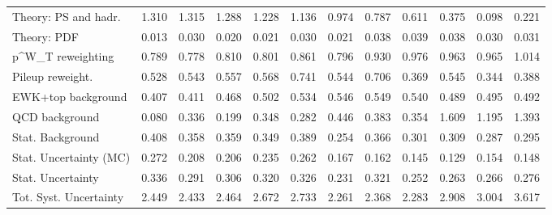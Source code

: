 \begin{tabular}{l|p{0.6cm}p{0.6cm}p{0.6cm}p{0.6cm}p{0.6cm}p{0.6cm}p{0.6cm}p{0.6cm}p{0.6cm}p{0.6cm}p{0.6cm}}
Theory: PS and hadr.                     & 1.310 & 1.315 & 1.288 & 1.228 & 1.136 & 0.974 & 0.787 & 0.611 & 0.375 & 0.098 & 0.221 \\
Theory: PDF                              & 0.013 & 0.030 & 0.020 & 0.021 & 0.030 & 0.021 & 0.038 & 0.039 & 0.038 & 0.030 & 0.031 \\
p^{W}_{T} reweighting                    & 0.789 & 0.778 & 0.810 & 0.801 & 0.861 & 0.796 & 0.930 & 0.976 & 0.963 & 0.965 & 1.014 \\
Pileup reweight.                         & 0.528 & 0.543 & 0.557 & 0.568 & 0.741 & 0.544 & 0.706 & 0.369 & 0.545 & 0.344 & 0.388 \\
EWK+top background                       & 0.407 & 0.411 & 0.468 & 0.502 & 0.534 & 0.546 & 0.549 & 0.540 & 0.489 & 0.495 & 0.492 \\
QCD background                           & 0.080 & 0.336 & 0.199 & 0.348 & 0.282 & 0.446 & 0.383 & 0.354 & 1.609 & 1.195 & 1.393 \\
Stat. Background                         & 0.408 & 0.358 & 0.359 & 0.349 & 0.389 & 0.254 & 0.366 & 0.301 & 0.309 & 0.287 & 0.295 \\
Stat. Uncertainty (MC)                   & 0.272 & 0.208 & 0.206 & 0.235 & 0.262 & 0.167 & 0.162 & 0.145 & 0.129 & 0.154 & 0.148 \\
\hline
Stat. Uncertainty                        & 0.336 & 0.291 & 0.306 & 0.320 & 0.326 & 0.231 & 0.321 & 0.252 & 0.263 & 0.266 & 0.276 \\
\hline
Tot. Syst. Uncertainty                   & 2.449 & 2.433 & 2.464 & 2.672 & 2.733 & 2.261 & 2.368 & 2.283 & 2.908 & 3.004 & 3.617 \\
\hline
\end{tabular}

